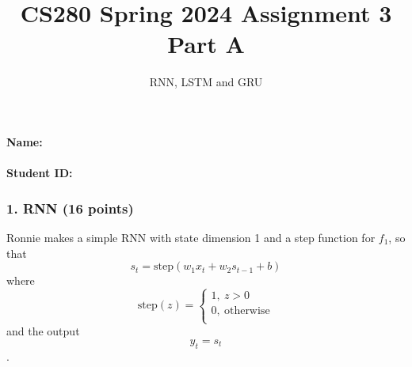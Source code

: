 \documentclass[12pt]{article}%
\begin{document}
\title{CS280 Spring 2024 Assignment 3 \\ Part A}
\author{RNN, LSTM and GRU}
\maketitle

\paragraph{Name:}

\paragraph{Student ID:}

\newpage


\subsubsection*{1. RNN (16 points)}
Ronnie makes a simple RNN with state dimension 1 and a step function for $f_1$, so that
$$s_t = \text{step}(w_1x_t+w_2s_{t-1}+b)$$
where \[ \text{step}(z)=\left\{
	\begin{array}{ll}
	  1,\ z>0\\
	  0,\ \text{otherwise}\\
	\end{array}
  \right. \] and the output $$y_t=s_t$$.
\end{document}
